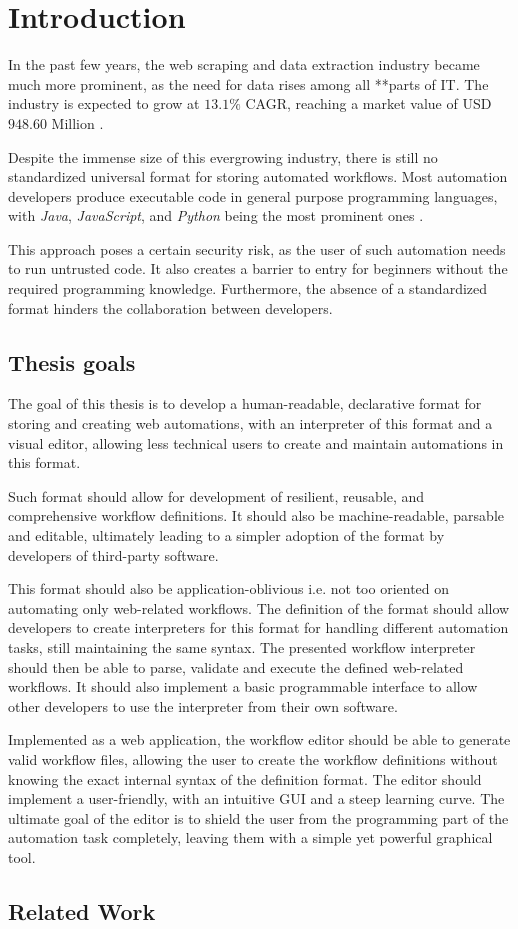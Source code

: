 \chapter*{Introduction}


In the past few years, the web scraping and data extraction industry became much more prominent, as the need for data rises among all **parts of IT. 
The industry is expected to grow at $13.1\%$ CAGR, reaching a market value of USD $948.60$ Million .
\par
Despite the immense size of this evergrowing industry, there is still no standardized universal format for storing automated workflows. 
Most automation developers produce executable code in general purpose programming languages, with \textit{Java}, \textit{JavaScript}, and \textit{Python} being the most prominent ones .
\par
This approach poses a certain security risk, as the user of such automation needs to run untrusted code. 
It also creates a barrier to entry for beginners without the required programming knowledge. 
Furthermore, the absence of a standardized format hinders the collaboration between developers.
\section*{Thesis goals}
The goal of this thesis is to develop a human-readable, declarative format for storing and creating web automations, with an interpreter of this format and a visual editor, allowing less technical users to create and maintain automations in this format.
\par
Such format should allow for development of resilient, reusable, and comprehensive workflow definitions. 
It should also be machine-readable, parsable and editable, ultimately leading to a simpler adoption of the format by developers of third-party software.
\par
This format should also be application-oblivious i.e. not too oriented on automating only web-related workflows.
The definition of the format should allow developers to create interpreters for this format for handling different automation tasks, still maintaining the same syntax.
The presented workflow interpreter should then be able to parse, validate and execute the defined web-related workflows. 
It should also implement a basic programmable interface to allow other developers to use the interpreter from their own software.
\par
Implemented as a web application, the workflow editor should be able to generate valid workflow files, allowing the user to create the workflow definitions without knowing the exact internal syntax of the definition format.
The editor should implement a user-friendly, with an intuitive \Ac{GUI} and a steep learning curve.
The ultimate goal of the editor is to shield the user from the programming part of the automation task completely, leaving them with a simple yet powerful graphical tool.
\section*{Related Work}